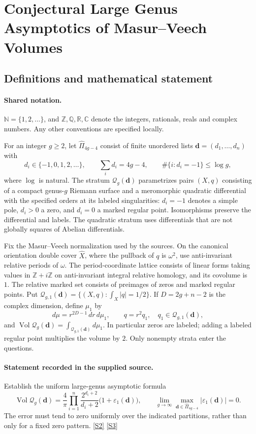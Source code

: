 \documentclass[11pt]{article}
\newcommand{\sref}[2]{\hyperlink{source:#1:#2}{[S#2]}}
\begin{document}
\section{Conjectural Large Genus Asymptotics of Masur–Veech Volumes}\label{statement}

\subsection{Definitions and mathematical statement}

\paragraph{Shared notation.}$\mathbb N=\{1,2,\ldots\}$, and $\mathbb Z,\mathbb Q,\mathbb R,\mathbb C$ denote the integers, rationals, reals and complex numbers. Any other conventions are specified locally.


For an integer $g\ge2$, let $\widehat\Pi_{4g-4}$ consist of finite unordered lists $\boldsymbol d=(d_1,\ldots,d_n)$ with
\[
 d_i\in\{-1,0,1,2,\ldots\},\qquad\sum_i d_i=4g-4,\qquad
 \#\{i:d_i=-1\}\le\log g,
\]
where $\log$ is natural. The stratum $\mathcal Q_g(\boldsymbol d)$ parametrizes pairs $(X,q)$ consisting of a compact genus-$g$ Riemann surface and a meromorphic quadratic differential with the specified orders at its labeled singularities: $d_i=-1$ denotes a simple pole, $d_i>0$ a zero, and $d_i=0$ a marked regular point. Isomorphisms preserve the differential and labels. The quadratic stratum uses differentials that are not globally squares of Abelian differentials.

Fix the Masur--Veech normalization used by the sources. On the canonical orientation double cover $\widehat X$, where the pullback of $q$ is $\omega^2$, use anti-invariant relative periods of $\omega$. The period-coordinate lattice consists of linear forms taking values in $\mathbb Z+i\mathbb Z$ on anti-invariant integral relative homology, and its covolume is $1$. The relative marked set consists of preimages of zeros and marked regular points. Put $\mathcal Q_{g,1}(\boldsymbol d)=\{(X,q):\int_X|q|=1/2\}$. If $D=2g+n-2$ is the complex dimension, define $\mu_1$ by
\[
 d\mu=r^{2D-1}\,dr\,d\mu_1,\qquad q=r^2q_1,\quad q_1\in\mathcal Q_{g,1}(\boldsymbol d),
\]
and $\operatorname{Vol}\mathcal Q_g(\boldsymbol d)=\int_{\mathcal Q_{g,1}(\boldsymbol d)}d\mu_1$. In particular zeros are labeled; adding a labeled regular point multiplies the volume by $2$. Only nonempty strata enter the questions.
\paragraph{Statement recorded in the supplied source.}
Establish the uniform large-genus asymptotic formula
\[
\operatorname{Vol}\mathcal Q_g(\boldsymbol d)
 =\frac4\pi\prod_{i=1}^{n}\frac{2^{d_i+2}}{d_i+2}\bigl(1+\varepsilon_1(\boldsymbol d)\bigr),\qquad
\lim_{g\to\infty}\max_{\boldsymbol d\in\widehat\Pi_{4g-4}}|\varepsilon_1(\boldsymbol d)|=0.
\]
The error must tend to zero uniformly over the indicated partitions, rather than only for a fixed zero pattern. \sref{statement}{2} \sref{statement}{3}
\end{document}
